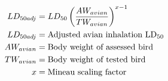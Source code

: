 \documentclass[fleqn, oneside, 11pt]{article}%
\begin{document}
\begin{preview}
\begin{align*}%
LD_{50adj} & = LD_{50}\left(\frac{AW_{avian}}{TW_{avian}}\right)^{x-1}\nonumber \\
LD_{50adj} & =  \text{Adjusted avian inhalation LD\textsubscript{50}} \nonumber \\
AW_{avian} & =  \text{Body weight of assessed bird} \nonumber \\
TW_{avian} & =  \text{Body weight of tested bird} \nonumber \\
x & =  \text{Mineau scaling factor} \nonumber \\
\end{align*} 
\end{preview}
\end{document}
